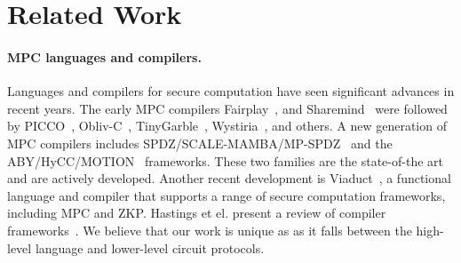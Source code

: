 \section{Related Work}
\label{sec:related}

\paragraph{MPC languages and compilers.}
Languages and compilers for secure computation have seen significant advances in recent years. The early MPC compilers Fairplay~\cite{CCS:BenNisPin08},
and Sharemind~\cite{ESORICS:BogLauWil08} were followed by PICCO~\cite{CCS:ZhaSteBla13}, Obliv-C~\cite{Zahur:2015}, TinyGarble~\cite{SP:SHSSK15},
Wystiria~\cite{SP:RasHamHic14}, and others. A new generation of MPC compilers
includes SPDZ/SCALE-MAMBA/MP-SPDZ~\cite{Keller:2020} and the ABY/HyCC/MOTION~\cite{NDSS:DemSchZoh15,CCS:BDKKS18,Braun:2022} frameworks.
These two families are the state-of-the art and
are actively developed. Another recent development is Viaduct~\cite{Acay:2021}, a functional language and compiler that supports a range of secure computation
frameworks, including MPC and ZKP. Hastings et el. present a review of compiler frameworks~\cite{Hastings:2019}. We believe that our work is unique as 
as it falls between the high-level language and lower-level circuit protocols.

\begin{comment}
While each of these languages and compilers brings in new ideas and advances, none addresses the problem of ``circuit independent'' intermediate
representation and optimization. We envision a classical compiler structure: (1) a Wysteria, Viaduct, Obliv-C, or IMP Source front end, including rich type systems and
AST-level semantic analysis, compile into the MPC Source IR, (2) MPC Source-level optimizations take place, followed by (3) back-end compilers into circuits.
Our focus is at the intermediate level.


Many works focus on the implementation of MPC protocols exposing an API to the programmer. For example, the ABY/MOTION line of
compiler frameworks provides a library of MPC primitives; the programmer writes MPC programs in C++ on top of the library. These back ends implement
different protocols and allow for mixing, but notably, they leave it to the programer to assign different protocols to different parts of the
computation and perform share conversion accordingly. In addition, MOTION provides SIMD primitives, which allows for efficient execution
of MPC operations, but again, using SIMD primitives is the responsibility of the programer. There is interest in frameworks for automatic mixing,
e.g., \cite{CCS:BDKKS18,Ishaq:2019,Fang:2022}.

Other works, e.g., Obliv-C~\cite{Zahur:2015}, Wystiria~\cite{SP:RasHamHic14} and Viaduct~\cite{Acay:2021} focus on higher-level language design, particularly information-flow systems that
restrict flow between secure and insecure parts of the program.
\end{comment}

